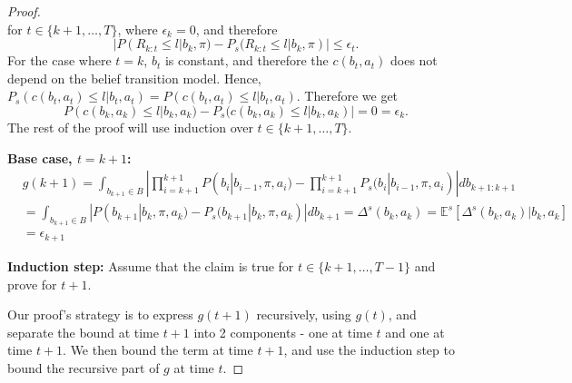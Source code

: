 \documentclass[10pt,a4paper]{amsart}
\begin{document}
\begin{proof}
\begin{equation}
	\end{equation}
	for $t \in \{k+1,\dots, T\}$, where $\epsilon_k=0$, and therefore 
	\begin{equation}
		|P(R_{k:t}\leq l|b_k,\pi)-P_s(R_{k:t}\leq l|b_k,\pi)|\leq \epsilon_t.
	\end{equation}
	For the case where $t=k$, $b_t$ is constant, and therefore the $c(b_t, a_t)$ does not depend on the belief transition model. Hence, $P_s(c(b_t, a_t)\leq l|b_t, a_t)=P(c(b_t, a_t)\leq l|b_t, a_t)$. Therefore we get
	\begin{equation}
		P(c(b_k, a_k)\leq l|b_k, a_k) - P_s(c(b_k, a_k)\leq l|b_k, a_k)|=0=\epsilon_k.
	\end{equation}
	The rest of the proof will use induction over $t\in \{k+1, \dots, T\}$.
	
	\textbf{Base case, $t=k+1$:}
	\begin{equation}
		\begin{aligned}
			&g(k+1)=\int_{b_{k+1}\in B} |\prod_{i=k+1}^{k+1} P(b_i|b_{i-1}, \pi, a_i) 
			- \prod_{i=k+1}^{k+1} P_s(b_i|b_{i-1}, \pi, a_i)|db_{k+1:k+1} \\
			&= \int_{b_{k+1}\in B} |P(b_{k+1}|b_{k}, \pi, a_{k}) - P_s(b_{k+1}|b_{k}, \pi, a_k)|db_{k+1} 
			= \Delta^s(b_{k}, a_k)=\mathbb{E}^s[\Delta^s(b_{k}, a_k)|b_k,a_k] \\
			&= \epsilon_{k+1}
		\end{aligned}
	\end{equation} 
	
	\textbf{Induction step:} Assume that the claim is true for $t\in \{k+1, \dots, T-1\}$ and prove for $t+1$.
	
	Our proof's strategy is to express $g(t+1)$ recursively, using $g(t)$, and separate the bound at time $t+1$ into 2 components - one at time $t$ and one at time $t+1$. We then bound the term at time $t+1$, and use the induction step to bound the recursive part of $g$ at time $t$. 
	

\end{proof}
\end{document}
